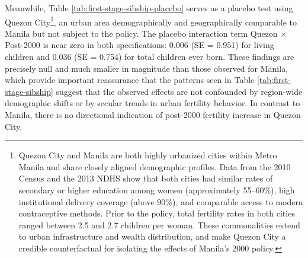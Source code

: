 \documentclass[]{AEA}
\begin{document}
Meanwhile, Table \ref{tab:first-stage-sibship-placebo} serves as a
placebo test using Quezon
City\footnote{Quezon City and Manila are both highly urbanized cities within Metro Manila and share closely aligned demographic profiles. Data from the 2010 Census and the 2013 NDHS show that both cities had similar rates of secondary or higher education among women (approximately 55--60\%), high institutional delivery coverage (above 90\%), and comparable access to modern contraceptive methods. Prior to the policy, total fertility rates in both cities ranged between 2.5 and 2.7 children per woman. These commonalities extend to urban infrastructure and wealth distribution, and make Quezon City a credible counterfactual for isolating the effects of Manila’s 2000 policy.\cite{psa2010,ndhs1998,ndhs2013,mmda2012}},
an urban area demographically and geographically comparable to Manila
but not subject to the policy. The placebo interaction term Quezon ×
Post-2000 is near zero in both specifications: 0.006 (SE = 0.951) for
living children and 0.036 (SE = 0.754) for total children ever born.
These findings are precisely null and much smaller in magnitude than
those observed for Manila, which provide important reassurance that the
patterns seen in Table \ref{tab:first-stage-sibship} suggest that the
observed effects are not confounded by region-wide demographic shifts or
by secular trends in urban fertility behavior. In contrast to Manila,
there is no directional indication of post-2000 fertility increase in
Quezon City.
\end{document}
